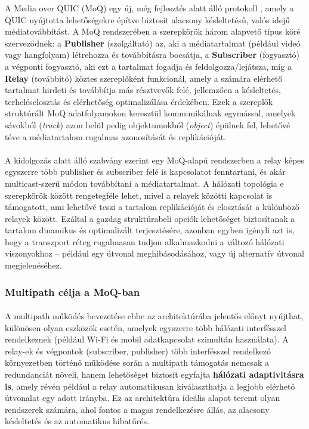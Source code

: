 \documentclass[a4paper,oneside]{article}
\begin{document}
A Media over QUIC (MoQ) egy új, még fejlesztés alatt álló protokoll \cite{moq_draft}, 
amely a QUIC nyújtotta lehetőségekre építve biztosít alacsony késleltetésű, 
valós idejű médiatovábbítást. A MoQ rendszerében a szerepkörök három alapvető 
típus köré szerveződnek: a \textbf{Publisher} (szolgáltató) az, aki a médiatartalmat (például 
videó vagy hangfolyam) létrehozza és továbbításra bocsátja, a \textbf{Subscriber} (fogyasztó)
a végponti fogyasztó, aki ezt a tartalmat fogadja és feldolgozza/lejátsza, míg a \textbf{Relay} (továbbító)
köztes szereplőként funkcionál, amely a számára elérhető tartalmat hirdeti és 
továbbítja más résztvevők felé, jellemzően a késleltetés, terheléselosztás 
és elérhetőség optimalizálása érdekében. 
Ezek a szereplők struktúrált MoQ adatfolyamokon keresztül kommunikálnak egymással, amelyek sávokból
(\emph{track}) azon belül pedig objektumokból (\emph{object}) épülnek 
fel, lehetővé téve a médiatartalom rugalmas azonosítását és replikációját.

\paragraph{}
A kidolgozás alatt álló szabvány szerint egy MoQ-alapú rendszerben a relay képes 
egyszerre több publisher és subscriber felé is kapcsolatot fenntartani, 
és akár multicast-szerű módon továbbítani a médiatartalmat. 
A hálózati topológia e szerepkörök között rengetegféle lehet, mivel 
a relayek közötti kapcsolat is támogatott, ami lehetővé teszi
a tartalom replikációját és elosztását a különböző relayek között. 
Ezáltal a gazdag struktúrabeli opciók lehetőséget biztosítanak a tartalom dinamikus 
és optimalizált terjesztésére, azonban egyben igényli azt is, hogy a transzport 
réteg rugalmasan tudjon alkalmazkodni a változó hálózati viszonyokhoz – például 
egy útvonal meghibásodásához, vagy új alternatív útvonal megjelenéséhez.

\subsubsection{Multipath célja a MoQ-ban}
\paragraph{}
A multipath működés bevezetése ebbe az architektúrába jelentős előnyt nyújthat, 
különösen olyan eszközök esetén, amelyek egyszerre több hálózati interfésszel 
rendelkeznek (például Wi-Fi és mobil adatkapcsolat szimultán használata). A relay-ek és végpontok 
(subscriber, publisher) több interfésszel rendelkező környezetben 
történő működése során a multipath támogatás nemcsak a redundanciát növeli, hanem 
lehetőséget biztosít egyfajta \textbf{hálózati adaptivitásra is}, amely révén például 
a relay automatikusan kiválaszthatja a legjobb elérhető útvonalat egy adott irányba. 
Ez az architektúra ideális alapot teremt olyan rendszerek számára, ahol fontos a magas 
rendelkezésre állás, az alacsony késleltetés és az automatikus hibatűrés.
\end{document}
